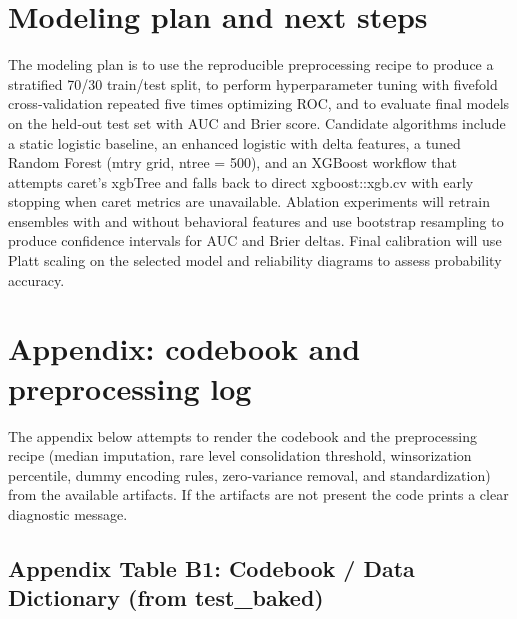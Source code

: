 \documentclass[
  12pt,
]{article}
\begin{document}
\section{Modeling plan and next
steps}\label{modeling-plan-and-next-steps}

The modeling plan is to use the reproducible preprocessing recipe to
produce a stratified 70/30 train/test split, to perform hyperparameter
tuning with fivefold cross‑validation repeated five times optimizing
ROC, and to evaluate final models on the held‑out test set with AUC and
Brier score. Candidate algorithms include a static logistic baseline, an
enhanced logistic with delta features, a tuned Random Forest (mtry grid,
ntree = 500), and an XGBoost workflow that attempts caret's xgbTree and
falls back to direct xgboost::xgb.cv with early stopping when caret
metrics are unavailable. Ablation experiments will retrain ensembles
with and without behavioral features and use bootstrap resampling to
produce confidence intervals for AUC and Brier deltas. Final calibration
will use Platt scaling on the selected model and reliability diagrams to
assess probability accuracy.

\section{Appendix: codebook and preprocessing
log}\label{appendix-codebook-and-preprocessing-log}

The appendix below attempts to render the codebook and the preprocessing
recipe (median imputation, rare level consolidation threshold,
winsorization percentile, dummy encoding rules, zero‑variance removal,
and standardization) from the available artifacts. If the artifacts are
not present the code prints a clear diagnostic message.

\subsection{Appendix Table B1: Codebook / Data Dictionary (from
test\_baked)}\label{appendix-table-b1-codebook-data-dictionary-from-test_baked}
\end{document}
